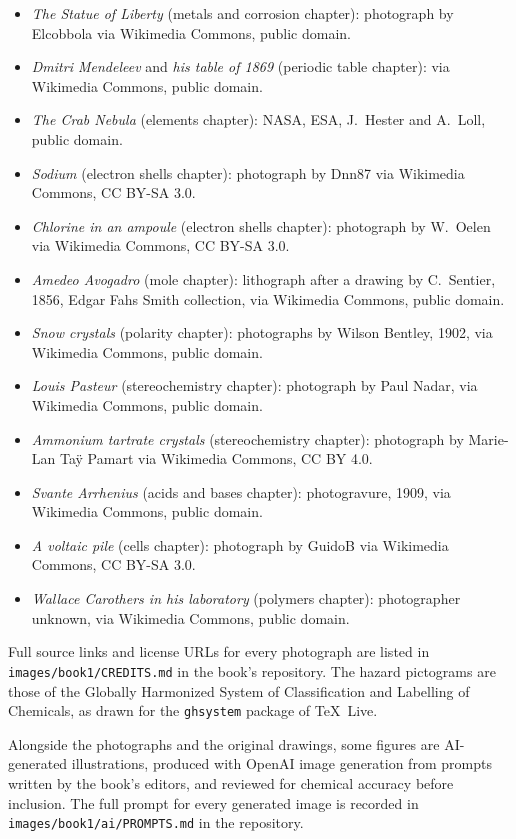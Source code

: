 \begin{itemize}
        via Wikimedia Commons, CC BY-SA 3.0.
  \item \emph{The Statue of Liberty} (metals and corrosion chapter):
        photograph by Elcobbola via Wikimedia Commons, public domain.
  \item \emph{Dmitri Mendeleev} and \emph{his table of 1869} (periodic
        table chapter): via Wikimedia Commons, public domain.
  \item \emph{The Crab Nebula} (elements chapter): NASA, ESA, J.~Hester
        and A.~Loll, public domain.
  \item \emph{Sodium} (electron shells chapter): photograph by Dnn87 via
        Wikimedia Commons, CC BY-SA 3.0.
  \item \emph{Chlorine in an ampoule} (electron shells chapter):
        photograph by W.~Oelen via Wikimedia Commons, CC BY-SA 3.0.
  \item \emph{Amedeo Avogadro} (mole chapter): lithograph after a
        drawing by C.~Sentier, 1856, Edgar Fahs Smith collection, via
        Wikimedia Commons, public domain.
  \item \emph{Snow crystals} (polarity chapter): photographs by Wilson
        Bentley, 1902, via Wikimedia Commons, public domain.
  \item \emph{Louis Pasteur} (stereochemistry chapter): photograph by
        Paul Nadar, via Wikimedia Commons, public domain.
  \item \emph{Ammonium tartrate crystals} (stereochemistry chapter):
        photograph by Marie-Lan Taÿ Pamart via Wikimedia Commons,
        CC BY 4.0.
  \item \emph{Svante Arrhenius} (acids and bases chapter): photogravure,
        1909, via Wikimedia Commons, public domain.
  \item \emph{A voltaic pile} (cells chapter): photograph by GuidoB via
        Wikimedia Commons, CC BY-SA 3.0.
  \item \emph{Wallace Carothers in his laboratory} (polymers chapter):
        photographer unknown, via Wikimedia Commons, public domain.
\end{itemize}

Full source links and license URLs for every photograph are listed
in \texttt{images/book1/CREDITS.md} in the book's repository.
The hazard pictograms are those of the Globally Harmonized System of
Classification and Labelling of Chemicals, as drawn for the
\texttt{ghsystem} package of \TeX\ Live.

\bigskip
Alongside the photographs and the original drawings, some figures are
AI-generated illustrations, produced with OpenAI image generation from
prompts written by the book's editors, and reviewed for chemical
accuracy before inclusion. The full prompt for every generated image is
recorded in \texttt{images/book1/ai/PROMPTS.md} in the repository.
\clearpage
